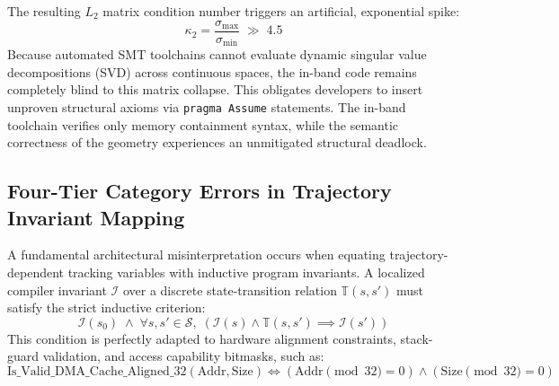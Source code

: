 The resulting \(L_2\) matrix condition number triggers an artificial, exponential spike:
\begin{equation}
\kappa_2 = \frac{\sigma_{\max}}{\sigma_{\min}} \;\gg\; 4.5
\end{equation}
Because automated SMT toolchains cannot evaluate dynamic singular value decompositions (SVD) across continuous spaces, the in-band code remains completely blind to this matrix collapse. This obligates developers to insert unproven structural axioms via \texttt{pragma Assume} statements. The in-band toolchain verifies only memory containment syntax, while the semantic correctness of the geometry experiences an unmitigated structural deadlock.

\subsection{Four-Tier Category Errors in Trajectory Invariant Mapping}
A fundamental architectural misinterpretation occurs when equating trajectory-dependent tracking variables with inductive program invariants. A localized compiler invariant $\mathcal{I}$ over a discrete state-transition relation $\mathbb{T}(s, s')$ must satisfy the strict inductive criterion:
\begin{equation}
\mathcal{I}(s_0) \;\land\; \forall s, s' \in \mathcal{S}, \; \left(\mathcal{I}(s) \land \mathbb{T}(s, s') \implies \mathcal{I}(s')\right)
\end{equation}
This condition is perfectly adapted to hardware alignment constraints, stack-guard validation, and access capability bitmasks, such as:
\begin{equation}
\mathrm{Is\_Valid\_DMA\_Cache\_Aligned\_32}(\mathrm{Addr}, \mathrm{Size}) \iff (\mathrm{Addr} \pmod{32} = 0) \land (\mathrm{Size} \pmod{32} = 0)
\end{equation}


